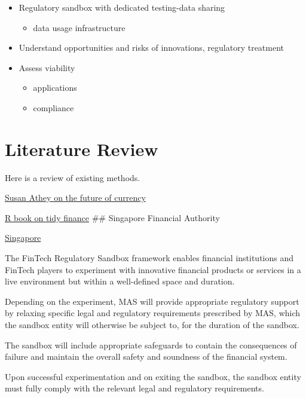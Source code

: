 \documentclass[
]{book}
\providecommand{\tightlist}{%
  \setlength{\itemsep}{0pt}\setlength{\parskip}{0pt}}
\begin{document}
\begin{itemize}
\item
  Regulatory sandbox with dedicated testing-data sharing

  \begin{itemize}
  \tightlist
  \item
    data usage infrastructure
  \end{itemize}
\item
  Understand opportunities and risks of innovations, regulatory treatment
\item
  Assess viability

  \begin{itemize}
  \tightlist
  \item
    applications
  \item
    compliance
  \end{itemize}
\end{itemize}

\hypertarget{literature-review}{%
\section{Literature Review}\label{literature-review}}

Here is a review of existing methods.

\href{https://www.youtube.com/watch?v=tyN9CwJsQdg}{Susan Athey on the future of currency}

\href{https://tidy-finance.org/introduction-to-tidy-finance.html}{R book on tidy finance}
\#\# Singapore Financial Authority

\href{https://www.mas.gov.sg/development/fintech/regulatory-sandbox}{Singapore}

The FinTech Regulatory Sandbox framework enables financial institutions and FinTech players to experiment with innovative financial products or services in a live environment but within a well-defined space and duration.

Depending on the experiment, MAS will provide appropriate regulatory support by relaxing specific legal and regulatory requirements prescribed by MAS, which the sandbox entity will otherwise be subject to, for the duration of the sandbox.

The sandbox will include appropriate safeguards to contain the consequences of failure and maintain the overall safety and soundness of the financial system.

Upon successful experimentation and on exiting the sandbox, the sandbox entity must fully comply with the relevant legal and regulatory requirements.
\end{document}
